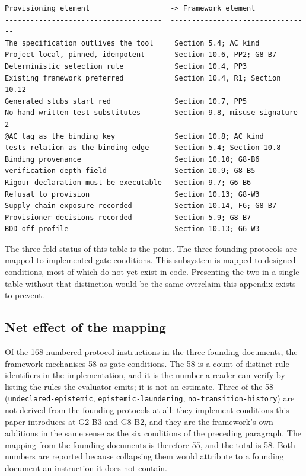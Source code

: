 \documentclass[11pt,a4paper]{article}
\begin{document}
\begin{Verbatim}[fontsize=\footnotesize,breaklines=true,breakanywhere=true,breakautoindent=false,samepage=false]
Provisioning element                   -> Framework element
-------------------------------------  ---------------------------------
The specification outlives the tool     Section 5.4; AC kind
Project-local, pinned, idempotent       Section 10.6, PP2; G8-B7
Deterministic selection rule            Section 10.4, PP3
Existing framework preferred            Section 10.4, R1; Section 10.12
Generated stubs start red               Section 10.7, PP5
No hand-written test substitutes        Section 9.8, misuse signature 2
@AC tag as the binding key              Section 10.8; AC kind
tests relation as the binding edge      Section 5.4; Section 10.8
Binding provenance                      Section 10.10; G8-B6
verification-depth field                Section 10.9; G8-B5
Rigour declaration must be executable   Section 9.7; G6-B6
Refusal to provision                    Section 10.13; G8-W3
Supply-chain exposure recorded          Section 10.14, F6; G8-B7
Provisioner decisions recorded          Section 5.9; G8-B7
BDD-off profile                         Section 10.13; G6-W3
\end{Verbatim}

The three-fold status of this table is the point. The three founding protocols are mapped to implemented gate conditions. This subsystem is mapped to designed conditions, most of which do not yet exist in code. Presenting the two in a single table without that distinction would be the same overclaim this appendix exists to prevent.

\subsection{Net effect of the mapping}

Of the 168 numbered protocol instructions in the three founding documents, the framework mechanises 58 as gate conditions. The 58 is a count of distinct rule identifiers in the implementation, and it is the number a reader can verify by listing the rules the evaluator emits; it is not an estimate. Three of the 58 (\texttt{undeclared-epistemic}, \texttt{epistemic-laundering}, \texttt{no-transition-history}) are not derived from the founding protocols at all: they implement conditions this paper introduces at G2-B3 and G8-B2, and they are the framework's own additions in the same sense as the six conditions of the preceding paragraph. The mapping from the founding documents is therefore 55, and the total is 58. Both numbers are reported because collapsing them would attribute to a founding document an instruction it does not contain.
\end{document}
